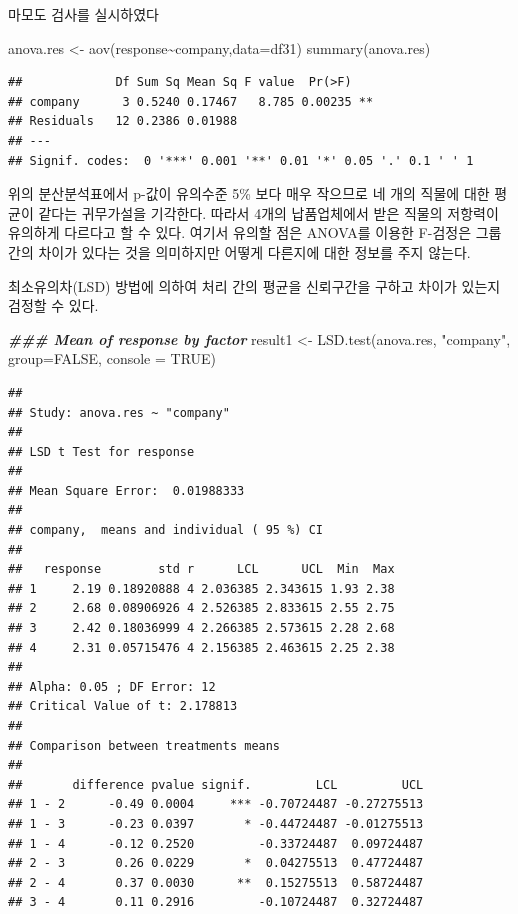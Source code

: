 \documentclass[
]{book}
\newenvironment{Shaded}{\begin{snugshade}}{\end{snugshade}}
\newcommand{\AttributeTok}[1]{\textcolor[rgb]{0.77,0.63,0.00}{#1}}
\newcommand{\ConstantTok}[1]{\textcolor[rgb]{0.00,0.00,0.00}{#1}}
\newcommand{\DocumentationTok}[1]{\textcolor[rgb]{0.56,0.35,0.01}{\textbf{\textit{#1}}}}
\newcommand{\FunctionTok}[1]{\textcolor[rgb]{0.00,0.00,0.00}{#1}}
\newcommand{\NormalTok}[1]{#1}
\newcommand{\OtherTok}[1]{\textcolor[rgb]{0.56,0.35,0.01}{#1}}
\newcommand{\SpecialCharTok}[1]{\textcolor[rgb]{0.00,0.00,0.00}{#1}}
\newcommand{\StringTok}[1]{\textcolor[rgb]{0.31,0.60,0.02}{#1}}
\begin{document}
마모도 검사를 실시하였다

\begin{Shaded}
\begin{Highlighting}[]
\NormalTok{anova.res }\OtherTok{\textless{}{-}} \FunctionTok{aov}\NormalTok{(response}\SpecialCharTok{\textasciitilde{}}\NormalTok{company,}\AttributeTok{data=}\NormalTok{df31) }
\FunctionTok{summary}\NormalTok{(anova.res)}
\end{Highlighting}
\end{Shaded}

\begin{verbatim}
##             Df Sum Sq Mean Sq F value  Pr(>F)   
## company      3 0.5240 0.17467   8.785 0.00235 **
## Residuals   12 0.2386 0.01988                   
## ---
## Signif. codes:  0 '***' 0.001 '**' 0.01 '*' 0.05 '.' 0.1 ' ' 1
\end{verbatim}

위의 분산분석표에서 p-값이 유의수준 5\% 보다 매우 작으므로 네 개의 직물에 대한 평균이 같다는 귀무가설을 기각한다. 따라서 4개의 납품업체에서 받은 직물의 저항력이 유의하게 다르다고 할 수 있다. 여기서 유의할 점은 ANOVA를 이용한 F-검정은 그룹 간의 차이가 있다는 것을 의미하지만 어떻게 다른지에 대한 정보를 주지 않는다.

최소유의차(LSD) 방법에 의하여 처리 간의 평균을 신뢰구간을 구하고 차이가 있는지 검정할 수 있다.

\begin{Shaded}
\begin{Highlighting}[]
\DocumentationTok{\#\#\# Mean of response by factor}
\NormalTok{result1 }\OtherTok{\textless{}{-}} \FunctionTok{LSD.test}\NormalTok{(anova.res, }\StringTok{"company"}\NormalTok{, }\AttributeTok{group=}\ConstantTok{FALSE}\NormalTok{, }\AttributeTok{console =} \ConstantTok{TRUE}\NormalTok{)}
\end{Highlighting}
\end{Shaded}

\begin{verbatim}
## 
## Study: anova.res ~ "company"
## 
## LSD t Test for response 
## 
## Mean Square Error:  0.01988333 
## 
## company,  means and individual ( 95 %) CI
## 
##   response        std r      LCL      UCL  Min  Max
## 1     2.19 0.18920888 4 2.036385 2.343615 1.93 2.38
## 2     2.68 0.08906926 4 2.526385 2.833615 2.55 2.75
## 3     2.42 0.18036999 4 2.266385 2.573615 2.28 2.68
## 4     2.31 0.05715476 4 2.156385 2.463615 2.25 2.38
## 
## Alpha: 0.05 ; DF Error: 12
## Critical Value of t: 2.178813 
## 
## Comparison between treatments means
## 
##       difference pvalue signif.         LCL         UCL
## 1 - 2      -0.49 0.0004     *** -0.70724487 -0.27275513
## 1 - 3      -0.23 0.0397       * -0.44724487 -0.01275513
## 1 - 4      -0.12 0.2520         -0.33724487  0.09724487
## 2 - 3       0.26 0.0229       *  0.04275513  0.47724487
## 2 - 4       0.37 0.0030      **  0.15275513  0.58724487
## 3 - 4       0.11 0.2916         -0.10724487  0.32724487
\end{verbatim}
\end{document}
